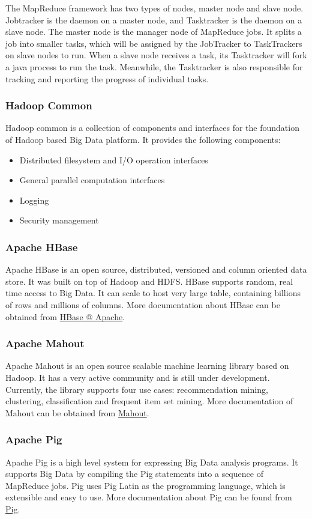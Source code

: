 The MapReduce framework has two types of nodes, master node and slave node. Jobtracker is the daemon on a master node, and Tasktracker is the daemon on a slave node. The master node is the manager node of MapReduce jobs. It splits a job into smaller tasks, which will be assigned by the JobTracker to TaskTrackers on slave nodes to run. When a slave node receives a task, its Tasktracker will fork a java process to run the task. Meanwhile, the Tasktracker is also responsible for tracking and reporting the progress of individual tasks.
\subsubsection*{Hadoop Common}
Hadoop common is a collection of components and interfaces for the foundation of Hadoop based Big Data platform. It provides the following components:
\begin{itemize}
  \item Distributed filesystem and I/O operation interfaces
  \item General parallel computation interfaces
  \item Logging
  \item Security management
\end{itemize}
\subsubsection*{Apache HBase}
Apache HBase is an open source, distributed, versioned and column oriented data store. It was built on top of Hadoop and HDFS. HBase supports random, real time access to Big Data. It can scale to host very large table, containing billions of rows and millions of columns. More documentation about HBase can be obtained from \href{http://hbase.apache.org}{HBase @ Apache}.
\subsubsection*{Apache Mahout}
Apache Mahout is an open source scalable machine learning library based on Hadoop. It has a very active community and is still under development. Currently, the library supports four use cases: recommendation mining, clustering, classification and frequent item set mining. More documentation of Mahout can be obtained from \href{http://mahout.apache.org}{Mahout}.
\subsubsection*{Apache Pig}
Apache Pig is a high level system for expressing Big Data analysis programs. It supports Big Data by compiling the Pig statements into a sequence of MapReduce jobs. Pig uses Pig Latin as the programming language, which is extensible and easy to use. More documentation about Pig can be found from \href{http://pig.apache.org}{Pig}.

